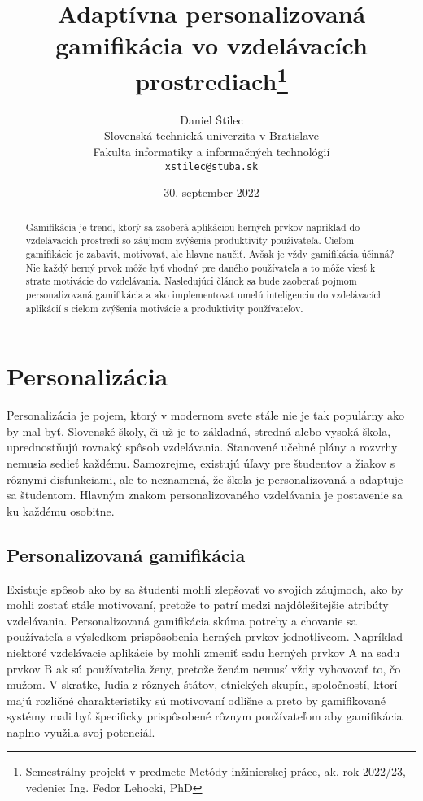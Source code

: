 \documentclass[10pt,twoside,slovak,a4paper]{article}
\title{Adaptívna personalizovaná gamifikácia vo vzdelávacích prostrediach\thanks{Semestrálny projekt v predmete Metódy inžinierskej práce, ak. rok 2022/23, vedenie: Ing. Fedor Lehocki, PhD}} %
\author{Daniel Štilec\\[2pt]
	{\small Slovenská technická univerzita v Bratislave}\\
	{\small Fakulta informatiky a informačných technológií}\\
	{\small \texttt{xstilec@stuba.sk}}
	}
\date{\small 30. september 2022} %
\begin{document}
\maketitle

\begin{abstract}
Gamifikácia je trend, ktorý sa zaoberá aplikáciou herných prvkov napríklad do vzdelávacích prostredí so záujmom zvýšenia produktivity používateľa. Cieľom gamifikácie je zabaviť, motivovať, ale hlavne naučiť. Avšak je vždy gamifikácia účinná? Nie každý herný prvok môže byť vhodný pre daného používateľa a to môže viesť k strate motivácie do vzdelávania. Nasledujúci článok sa bude zaoberať pojmom personalizovaná gamifikácia a ako implementovať umelú inteligenciu do vzdelávacích aplikácií s cieľom zvýšenia motivácie a produktivity používateľov.
\end{abstract}


\section{Personalizácia} \label{personalizacia}

	Personalizácia je pojem, ktorý v modernom svete stále nie je tak populárny ako by mal byť. Slovenské školy, či už je to základná, stredná alebo vysoká škola, uprednostňujú rovnaký spôsob vzdelávania. Stanovené učebné plány a rozvrhy nemusia sedieť každému. Samozrejme, existujú úľavy pre študentov a žiakov s rôznymi disfunkciami, ale to neznamená, že škola je personalizovaná a adaptuje sa študentom. Hlavným znakom personalizovaného vzdelávania je postavenie sa ku každému osobitne.

\subsection{Personalizovaná gamifikácia} \label{personalizacia:gamifikacia}

	Existuje spôsob ako by sa študenti mohli zlepšovať vo svojich záujmoch, ako by mohli zostať stále motivovaní, pretože to patrí medzi najdôležitejšie atribúty vzdelávania. Personalizovaná gamifikácia skúma potreby a chovanie sa používateľa s výsledkom prispôsobenia herných prvkov jednotlivcom. Napríklad niektoré vzdelávacie aplikácie by mohli zmeniť sadu herných prvkov A na sadu prvkov B ak sú používatelia ženy, pretože ženám nemusí vždy vyhovovať to, čo mužom. V skratke, ľudia z rôznych štátov, etnických skupín, spoločností, ktorí majú rozličné charakteristiky sú motivovaní odlišne a preto by gamifikované systémy mali byť špecificky prispôsobené rôznym používateľom aby gamifikácia naplno využila svoj potenciál. 
\end{document}
